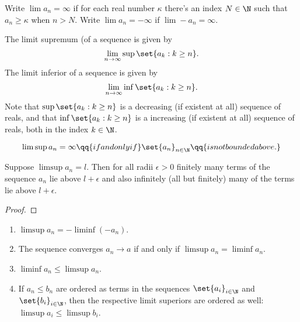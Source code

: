 \begin{defn}
    \label{defn:infinite_limits}
    Write $\lim a_n = \infty$ if for each real number $\kappa$ there's an index $N \in \N$ such that $a_n \ge \kappa$ when $n > N$.
    Write $\lim a_n = -\infty$ if $\lim -a_n = \infty$.
\end{defn}

\begin{defn}
    \label{defn:limit_sup}
    The limit supremum (of a sequence is given by 
    \begin{equation*}
        \lim_{n \to \infty} \sup \set{a_k : k \ge n}.
    \end{equation*}
    The limit inferior of a sequence is given by 
    \begin{equation*}
        \lim_{n \to \infty} \inf \set{a_k : k \ge n}.
    \end{equation*}
    Note that $\sup \set{a_k : k \ge n}$ is a decreasing (if existent at all) sequence of reals, and that $\inf \set{a_k : k \ge n}$ is a increasing (if existent at all) sequence of reals, both in the index $k \in \N$.
\end{defn}

\begin{prop}
    \label{prop:bounding_limit_superiors}
    \begin{equation*}
        \limsup a_n = \infty \qq{if and only if} \set{a_n}_{n\in \N} \qq{is not bounded above.}
    \end{equation*}
\end{prop}

\begin{thm}
    \label{thm:perturbations_to_the_limit_superior}
    Suppose $\limsup a_n = l$. Then for all radii $\epsilon > 0$ finitely many terms of the sequence $a_n$ lie above $l + \epsilon$ and also infinitely (\TODO all but finitely) many of the terms lie above $l + \epsilon$.
\end{thm}
\begin{proof}
\TODO
\end{proof}

\begin{prop}
    \label{prop:properties_of_the_limit_superior}
    \begin{enumerate}
\item $\limsup a_n = - \liminf (-a_n)$. 
\item The sequence converges $a_n \to a$ if and only if $\limsup a_n  = \liminf a_n$.
\item $\liminf a_n \le \limsup a_n$.
\item If $a_n \le b_n$ are ordered as terms in the sequences $\set{a_i}_{i \in \N}$ and $\set{b_i}_{i \in \N}$, then the respective limit superiors are ordered as well: $\limsup a_i \le \limsup b_i$.
    \end{enumerate}
\end{prop}

